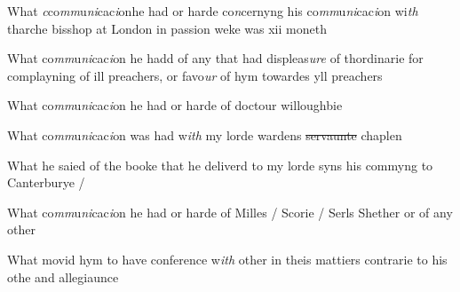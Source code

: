 \documentclass[12pt, a4paper]{book}
\begin{document}
            		
				\marginpar[\vspace{0.5cm}{\textcolor{Gray}{2}}]{}
			 
		\ifthenelse{\isodd{\thepage}}
		{\reversemarginpar}
		{\normalmarginpar}
		What \textit{c}co\textit{mm}u\textit{ni}cac\textit{i}onhe had or harde co\textit{n}cernyng his co\textit{mm}u\textit{ni}cac\textit{i}on wi\textit{th }tharche
bisshop at London in passion weke was xii moneth

            		
				\marginpar[\vspace{0.5cm}{\textcolor{Gray}{3}}]{}
			 
		\ifthenelse{\isodd{\thepage}}
		{\reversemarginpar}
		{\normalmarginpar}
		What co\textit{mm}u\textit{ni}cac\textit{i}on he hadd of any that had displeas\textit{ure} of thordinarie 
for complayning of ill preachers, or favo\textit{ur} of hym towardes 
yll preachers

            		
				\marginpar[\vspace{0.5cm}{\textcolor{Gray}{4}}]{}
			 
		\ifthenelse{\isodd{\thepage}}
		{\reversemarginpar}
		{\normalmarginpar}
		What co\textit{mm}u\textit{ni}cac\textit{i}on he had or harde of doctour willoughbie

            		            		
				\marginpar[\vspace{0.5cm}{\textcolor{Gray}{5}}]{}
			 
		\ifthenelse{\isodd{\thepage}}
		{\reversemarginpar}
		{\normalmarginpar}
		What co\textit{mm}u\textit{ni}cac\textit{i}on was had w\textit{ith} my lorde wardens \sout{servaunte }chaplen

            		
				\marginpar[\vspace{0.5cm}{\textcolor{Gray}{6}}]{}
			 
		\ifthenelse{\isodd{\thepage}}
		{\reversemarginpar}
		{\normalmarginpar}
		What he saied of the booke that he deliverd to my lorde syns
his commyng to Canterburye /

            		
				\marginpar[\vspace{0.5cm}{\textcolor{Gray}{7}}]{}
			 
		\ifthenelse{\isodd{\thepage}}
		{\reversemarginpar}
		{\normalmarginpar}
		What co\textit{mm}u\textit{ni}cac\textit{i}on he had or harde of Milles / Scorie / Serls
Shether or of any other

            		
				\marginpar[\vspace{0.5cm}{\textcolor{Gray}{8}}]{}
			 
		\ifthenelse{\isodd{\thepage}}
		{\reversemarginpar}
		{\normalmarginpar}
		What movid hym to have conference w\textit{ith} other in theis mattiers
contrarie to his othe and allegiaunce
\end{document}

